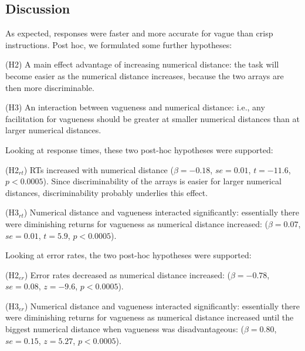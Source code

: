 \documentclass[%
man,		%
floatsintext,%
apacite%
]{apa6}
\begin{document}
\subsection{Discussion}

As expected, responses were faster and more accurate for vague than crisp instructions. Post hoc, we formulated some further hypotheses:

\begin{APAenumerate}
	\item [(H2)] A main effect advantage of increasing numerical distance: the task will become easier as the numerical distance increases, because the two arrays are then more discriminable.
	\item [(H3)] An interaction between vagueness and numerical distance: i.e., any facilitation for vagueness should be greater at smaller numerical distances than at larger numerical distances.
\end{APAenumerate}

Looking at response times, these two post-hoc hypotheses were supported:

\begin{APAenumerate}
	\item [(H2$_{rt}$)] RTs increased with numerical distance 
	($\beta=-0.18$, $se=0.01$, $t=-11.6$, $p<0.0005$). %
	Since discriminability of the arrays is easier for larger numerical distances, discriminability probably underlies this effect. 
	\item [(H3$_{rt}$)] Numerical distance and vagueness interacted significantly: essentially there were diminishing returns for vagueness as numerical distance increased: 
	($\beta=0.07$, $se=0.01$, $t=5.9$, $p<0.0005$). %
\end{APAenumerate}

Looking at error rates, the two post-hoc hypotheses were supported:

\begin{APAenumerate}
	\item [(H2$_{er}$)] Error rates decreased as numerical distance increased: 
	($\beta=-0.78$, $se=0.08$, $z=-9.6$, $p<0.0005$).%
	\item [(H3$_{er}$)] Numerical distance and vagueness interacted significantly: essentially there were diminishing returns for vagueness as numerical distance increased until the biggest numerical distance when vagueness was disadvantageous: 
	($\beta=0.80$, $se=0.15$, $z=5.27$, $p<0.0005$). %
\end{APAenumerate}
\end{document}
